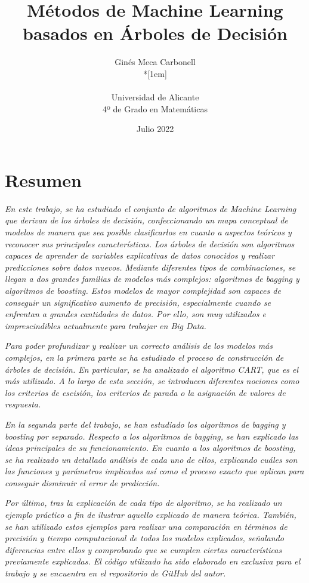 \documentclass[12pt,twoside]{article}
\title{Métodos de Machine Learning basados en Árboles de Decisión}
\author{Ginés Meca Carbonell\\*[1em]
\begin{minipage}{0.75\textwidth}
\footnotesize \itshape
\begin{center}
Universidad de Alicante \\
4º de Grado en Matemáticas
\end{center}
\end{minipage}
}
\date{Julio 2022}
\begin{document}




\section*{Resumen}

\emph{En este trabajo, se ha estudiado el conjunto de algoritmos de Machine Learning que derivan de los árboles de decisión, confeccionando un mapa conceptual de modelos de manera que sea posible clasificarlos en cuanto a aspectos teóricos y reconocer sus principales características. Los árboles de decisión son algoritmos capaces de aprender de variables explicativas de datos conocidos y realizar predicciones sobre datos nuevos. Mediante diferentes tipos de combinaciones, se llegan a dos grandes familias de modelos más complejos: algoritmos de bagging y algoritmos de boosting. Estos modelos de mayor complejidad son capaces de conseguir un significativo aumento de precisión, especialmente cuando se enfrentan a grandes cantidades de datos. Por ello, son muy utilizados e imprescindibles actualmente para trabajar en Big Data.}

\emph{Para poder profundizar y realizar un correcto análisis de los modelos más complejos, en la primera parte se ha estudiado el proceso de construcción de árboles de decisión. En particular, se ha analizado el algoritmo CART, que es el más utilizado. A lo largo de esta sección, se introducen diferentes nociones como los criterios de escisión, los criterios de parada o la asignación de valores de respuesta.}

\emph{En la segunda parte del trabajo, se han estudiado los algoritmos de bagging y boosting por separado. Respecto a los algoritmos de bagging, se han explicado las ideas principales de su funcionamiento. En cuanto a los algoritmos de boosting, se ha realizado un detallado análisis de cada uno de ellos, explicando cuáles son las funciones y parámetros implicados así como el proceso exacto que aplican para conseguir disminuir el error de predicción.}

\emph{Por último, tras la explicación de cada tipo de algoritmo, se ha realizado un ejemplo práctico a fin de ilustrar aquello explicado de manera teórica. También, se han utilizado estos ejemplos para realizar una comparación en términos de precisión y tiempo computacional de todos los modelos explicados, señalando diferencias entre ellos y comprobando que se cumplen ciertas características previamente explicadas. El código utilizado ha sido elaborado en exclusiva para el trabajo y se encuentra en el repositorio de GitHub del autor.}
\end{document}
